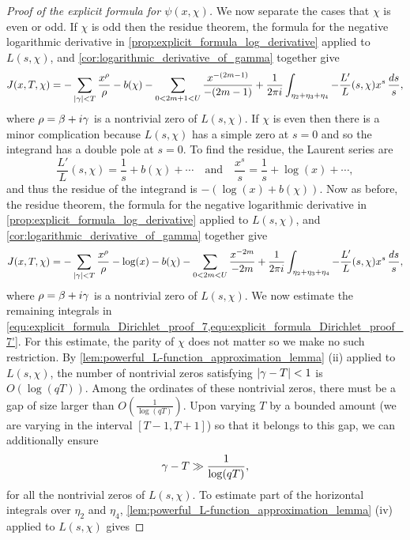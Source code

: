 \begin{proof}[Proof of the explicit formula for $\psi(x,\chi)$]
      We now separate the cases that $\chi$ is even or odd. If $\chi$ is odd then the residue theorem, the formula for the negative logarithmic derivative in \cref{prop:explicit_formula_log_derivative} applied to $L(s,\chi)$, and \cref{cor:logarithmic_derivative_of_gamma} together give
      \begin{equation}\label{equ:explicit_formula_Dirichlet_proof_7}
        J(x,T,\chi) = -\sum_{|\gamma| < T}\frac{x^{\rho}}{\rho}-b(\chi)-\sum_{0 < 2m+1 < U}\frac{x^{-(2m-1)}}{-(2m-1)}+\frac{1}{2\pi i}\int_{\eta_{2}+\eta_{3}+\eta_{4}}-\frac{L'}{L}(s,\chi)x^{s}\,\frac{ds}{s},
      \end{equation}
      where $\rho = \beta+i\gamma$ is a nontrivial zero of $L(s,\chi)$. If $\chi$ is even then there is a minor complication because $L(s,\chi)$ has a simple zero at $s = 0$ and so the integrand has a double pole at $s = 0$. To find the residue, the Laurent series are
      \[
        \frac{L'}{L}(s,\chi) = \frac{1}{s}+b(\chi)+\cdots \quad \text{and} \quad \frac{x^{s}}{s} = \frac{1}{s}+\log(x)+\cdots,
      \]
      and thus the residue of the integrand is $-(\log(x)+b(\chi))$. Now as before, the residue theorem, the formula for the negative logarithmic derivative in \cref{prop:explicit_formula_log_derivative} applied to $L(s,\chi)$, and \cref{cor:logarithmic_derivative_of_gamma} together give
      \begin{equation}\label{equ:explicit_formula_Dirichlet_proof_7'}
        J(x,T,\chi) = -\sum_{|\gamma| < T}\frac{x^{\rho}}{\rho}-\log(x)-b(\chi)-\sum_{0 < 2m < U}\frac{x^{-2m}}{-2m}+\frac{1}{2\pi i}\int_{\eta_{2}+\eta_{3}+\eta_{4}}-\frac{L'}{L}(s,\chi)x^{s}\,\frac{ds}{s},
      \end{equation}
      where $\rho = \beta+i\gamma$ is a nontrivial zero of $L(s,\chi)$. We now estimate the remaining integrals in \cref{equ:explicit_formula_Dirichlet_proof_7,equ:explicit_formula_Dirichlet_proof_7'}. For this estimate, the parity of $\chi$ does not matter so we make no such restriction. By \cref{lem:powerful_L-function_approximation_lemma} (ii) applied to $L(s,\chi)$, the number of nontrivial zeros satisfying $|\gamma-T| < 1$ is $O(\log(qT))$. Among the ordinates of these nontrivial zeros, there must be a gap of size larger than $O\left(\frac{1}{\log(qT)}\right)$. Upon varying $T$ by a bounded amount (we are varying in the interval $[T-1,T+1]$) so that it belongs to this gap, we can additionally ensure
      \[
        \gamma-T \gg \frac{1}{\log(qT)},
      \]
      for all the nontrivial zeros of $L(s,\chi)$. To estimate part of the horizontal integrals over $\eta_{2}$ and $\eta_{4}$, \cref{lem:powerful_L-function_approximation_lemma} (iv) applied to $L(s,\chi)$ gives

\end{proof}
